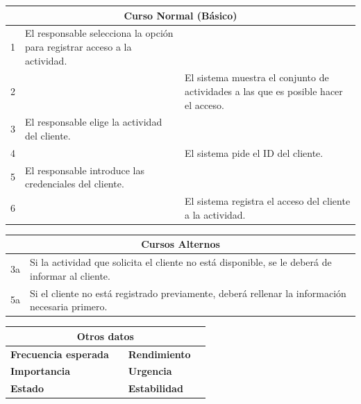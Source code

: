 \vspace{0.2cm}

\begin{table}[h!]
\centering
\begin{tabularx}{\textwidth}{|c|X|X|}
\hline
\multicolumn{3}{|c|}{\cellcolor[HTML]{F2F2F2}\textbf{Curso Normal (Básico)}} \\ \hline
1 & El responsable selecciona la opción para registrar acceso a la actividad. & \\ \hline
2 & & El sistema muestra el conjunto de actividades a las que es posible hacer el acceso. \\ \hline
3 & El responsable elige la actividad del cliente. & \\ \hline
4 & & El sistema pide el ID del cliente. \\ \hline
5 & El responsable introduce las credenciales del cliente. & \\ \hline
6 & & El sistema registra el acceso del cliente a la actividad. \\ \hline
\end{tabularx}
\end{table}

\vspace{0.2cm}

\begin{table}[h!]
\centering
\begin{tabularx}{\textwidth}{|c|X|}
\hline
\multicolumn{2}{|c|}{\cellcolor[HTML]{F2F2F2}\textbf{Cursos Alternos}} \\ \hline
3a & Si la actividad que solicita el cliente no está disponible, se le deberá de informar al cliente. \\ \hline
5a & Si el cliente no está registrado previamente, deberá rellenar la información necesaria primero. \\ \hline
\end{tabularx}
\end{table}

\vspace{0.2cm}

\begin{table}[h!]
\centering
\begin{tabularx}{\textwidth}{|X|X|X|X|}
\hline
\multicolumn{4}{|c|}{\cellcolor[HTML]{F2F2F2}\textbf{Otros datos}} \\ \hline
\textbf{Frecuencia esperada} &  & \textbf{Rendimiento} &  \\ \hline
\textbf{Importancia} &  & \textbf{Urgencia} &  \\ \hline
\textbf{Estado} &  & \textbf{Estabilidad} &  \\ \hline
\end{tabularx}
\end{table}

